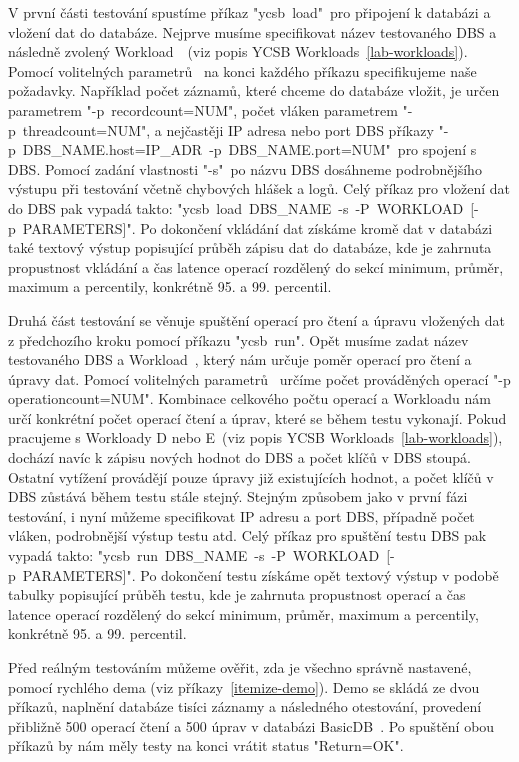 \documentclass[czech,master,dept460,male,csharp,cpdeclaration]{diploma}
\begin{document}
	V první části testování spustíme příkaz "ycsb~load"~pro připojení k databázi a vložení dat do databáze. Nejprve musíme specifikovat název testovaného DBS a následně zvolený Workload~\cite{workloads}~(viz popis YCSB Workloads~\ref{lab-workloads}). Pomocí volitelných parametrů~\cite{ycsb-properties} na konci každého příkazu specifikujeme naše požadavky. Například počet záznamů, které chceme do databáze vložit, je určen parametrem "-p~recordcount=NUM", počet vláken parametrem "-p~threadcount=NUM", a nejčastěji IP adresa nebo port DBS příkazy "-p~DBS\_NAME.host=IP\_ADR~-p~DBS\_NAME.port=NUM"~pro spojení s DBS. Pomocí zadání vlastnosti "-s"~po názvu DBS dosáhneme podrobnějšího výstupu při testování včetně chybových hlášek a logů. Celý příkaz pro vložení dat do DBS pak vypadá takto: "ycsb~load~DBS\_NAME~-s~-P~WORKLOAD~[-p~PARAMETERS]". Po dokončení vkládání dat získáme kromě dat v databázi také textový výstup popisující průběh zápisu dat do databáze, kde je zahrnuta propustnost vkládání a čas latence operací rozdělený do sekcí minimum, průměr, maximum a percentily, konkrétně 95. a 99. percentil.
	
	Druhá část testování se věnuje spuštění operací pro čtení a úpravu vložených dat z předchozího kroku pomocí příkazu "ycsb~run". Opět musíme zadat název testovaného DBS a Workload~\cite{workloads}, který nám určuje poměr operací pro čtení a úpravy dat. Pomocí volitelných parametrů~\cite{ycsb-properties} určíme počet prováděných operací "-p operationcount=NUM". Kombinace celkového počtu operací a Workloadu nám určí konkrétní počet operací čtení a úprav, které se během testu vykonají. Pokud pracujeme s Workloady D nebo E~(viz popis YCSB Workloads~\ref{lab-workloads}), dochází navíc k zápisu nových hodnot do DBS a počet klíčů v DBS stoupá. Ostatní vytížení provádějí pouze úpravy již existujících hodnot, a počet klíčů v DBS zůstává během testu stále stejný. Stejným způsobem jako v první fázi testování, i nyní můžeme specifikovat IP adresu a port DBS, případně počet vláken, podrobnější výstup testu atd. Celý příkaz pro spuštění testu DBS pak vypadá takto: "ycsb~run~DBS\_NAME~-s~-P~WORKLOAD~[-p~PARAMETERS]". Po dokončení testu získáme opět textový výstup v podobě tabulky popisující průběh testu, kde je zahrnuta propustnost operací a čas latence operací rozdělený do sekcí minimum, průměr, maximum a percentily, konkrétně 95. a 99. percentil.
	
	Před reálným testováním můžeme ověřit, zda je všechno správně nastavené, pomocí rychlého dema (viz příkazy~\ref{itemize-demo}). Demo se skládá ze dvou příkazů, naplnění databáze tisíci záznamy a následného otestování, provedení přibližně 500 operací čtení a 500 úprav v databázi BasicDB~\cite{basicdb}. Po spuštění obou příkazů by nám měly testy na konci vrátit status "Return=OK".
	
\end{document}
